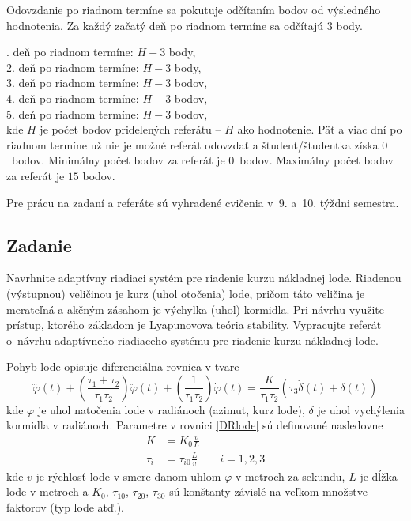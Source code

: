 ﻿\documentclass[a4paper, 10pt, ]{article}
\begin{document}
\bigskip

\noindent
Odovzdanie po riadnom termíne sa pokutuje odčítaním bodov od výsledného hodnotenia. Za každý začatý deň po riadnom termíne sa odčítajú 3 body.

. deň po riadnom termíne: $H-3$ body,\\
2. deň po riadnom termíne: $H-3$ body,\\
3. deň po riadnom termíne: $H-3$ bodov,\\
4. deň po riadnom termíne: $H-3$ bodov,\\
5. deň po riadnom termíne: $H-3$ bodov,\\
kde $H$ je počet bodov pridelených referátu -- $H$ ako hodnotenie. Päť a viac dní po riadnom termíne už nie je možné referát odovzdať a študent/študentka získa $0$~bodov. Minimálny počet bodov za referát je $0$~bodov. Maximálny počet bodov za referát je $15$ bodov.


\bigskip

\noindent
Pre prácu na zadaní a referáte sú vyhradené cvičenia v~9. a~10. týždni semestra.




\subsection{Zadanie}

\noindent
Navrhnite adaptívny riadiaci systém pre riadenie kurzu nákladnej lode. Riadenou (výstupnou) veličinou je kurz (uhol otočenia) lode, pričom táto veličina je merateľná a akčným zásahom je výchylka (uhol) kormidla. Pri návrhu využite prístup, ktorého základom je Lyapunovova teória stability. Vypracujte referát o~návrhu adaptívneho riadiaceho systému pre riadenie kurzu nákladnej lode.

Pohyb lode opisuje diferenciálna rovnica v tvare \cite{PY98}
\begin{equation} \label{DRlode}
	\dddot{\varphi}(t)
	+
	\left(
		\frac{\tau_1 + \tau_2}{\tau_1 \tau_2}
	\right)
	\ddot{\varphi}(t)
	+
	\left(
		\frac{1}{\tau_1 \tau_2}
	\right)
	\dot{\varphi}(t)
	=
	\frac{K}{\tau_1 \tau_2}
	\left(
		\tau_3
		\dot{\delta}(t)
		+
		\delta(t)
	\right)
\end{equation}
kde $\varphi$ je uhol natočenia lode v radiánoch (azimut, kurz lode), $\delta$ je uhol vychýlenia kormidla v radiánoch. Parametre v rovnici \eqref{DRlode} sú definované nasledovne
\begin{align}
	K &= K_0 \frac{v}{L} \\
	\tau_i &= \tau_{i0} \frac{L}{v} \qquad i=1,2,3
\end{align}
kde $v$ je rýchlosť lode v smere danom uhlom $\varphi$ v metroch za sekundu, $L$ je dĺžka lode v metroch a $K_0$, $\tau_{10}$, $\tau_{20}$, $\tau_{30}$ sú konštanty závislé na veľkom množstve faktorov (typ lode atď.).
\end{document}
